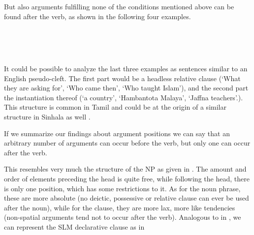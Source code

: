 But also arguments fulfilling none of the conditions mentioned above can be found after the verb, as shown in the following four examples.

 \\

 \\
 \\
It could be possible to analyze the last three examples as sentences similar to an English pseudo-cleft. The first part would be a headless relative clause (`What they are asking for',  `Who came then',  `Who taught Islam'), and the second part the instantiation thereof (`a country', `Hambantota Malaya', `Jaffna teachers'.). This structure is common in Tamil and could be at the origin of a similar structure in Sinhala as well \citep{Gair1985calque}.

If we summarize our findings about argument positions we can say that an arbitrary number of arguments can occur before the verb, but only one can occur after the verb.



This resembles very much the structure of the NP as given in . The amount and order of elements preceding the head is quite free, while following the head, there is only one position, which has some restrictions to it. As for the noun phrase, these are more absolute (no deictic, possessive or relative clause can ever be used after the noun), while for the clause, they are more lax, more like tendencies (non-spatial arguments tend not to occur after the verb). Analogous to  in , we can represent the SLM declarative clause as in 

